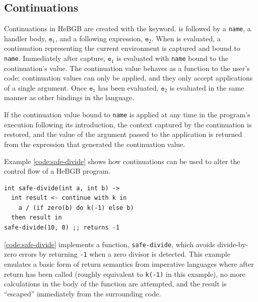 \documentclass[12pt]{article}
\begin{document}
\subsection{Continuations}
Continuations in HeBGB are created with the  keyword.
 is followed by a \texttt{name}, a handler body,
$\texttt{e}_1$, and a following expression, $\texttt{e}_2$.
When  is evaluated, a continuation representing the
current environment is captured and bound to \texttt{name}. Immediately
after capture, $\texttt{e}_1$ is evaluated with \texttt{name} bound to
the continuation's value. The continuation value behaves as a function to
the user's code; continuation values can only be applied, and they only
accept applications of a single argument. Once $\texttt{e}_1$ has been
evaluated, $\texttt{e}_2$ is evaluated in the same manner as other bindings 
in the language.

If the continuation value bound to \texttt{name} is applied at any time
in the program's execution following its introduction, 
the context captured by the continuation is restored, and the value 
of the argument passed to the application is returned from the 
 expression that generated the continuation value.

Example \ref{code:safe-divide} shows how continuations
can be used to alter the control flow of a HeBGB program.
\begin{code_box}
\label{code:safe-divide}
\begin{lstlisting}[language=HeBGB]
int safe-divide(int a, int b) ->
  int result <- continue with k in
    a / (if zero(b) do k(-1) else b)
  then result in
safe-divide(10, 0) ;; returns -1
\end{lstlisting}
\end{code_box}
\ref{code:safe-divide} implements a function, \texttt{safe-divide},
which avoids divide-by-zero errors by returning \texttt{-1} when
a zero divisor is detected. This example emulates a basic form
of return semantics from imperative languages where after return
has been called (roughly equivalent to \texttt{k(-1)} in this
example), no more calculations in the body of the function are
attempted, and the result is ``escaped'' immediately from the
surrounding code.
\end{document}
